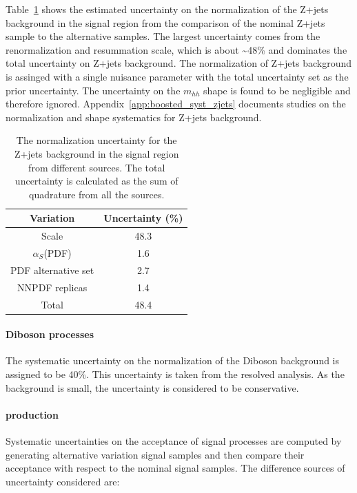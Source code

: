 Table~\ref{tab:boosted_unc_zjets} shows the estimated uncertainty on the normalization of the Z+jets background in the signal region
from the comparison of the nominal Z+jets sample to the alternative samples. The largest uncertainty comes from the renormalization
and resummation scale, which is about \textasciitilde48\% and dominates the total uncertainty on Z+jets background. The normalization of Z+jets
background is assinged with a single nuisance parameter with the total uncertainty set as the prior uncertainty. The uncertainty on the
$m_{hh}$ shape is found to be negligible and therefore ignored. Appendix~\ref{app:boosted_syst_zjets} documents studies on the normalization
and shape systematics for Z+jets background.
 
\begin{table}[htbp!]
\begin{center}
\begin{tabular}{c|c}
Variation  &  Uncertainty (\%) \\
\hline
Scale               &   48.3  \\
$\alpha_{S}$(PDF)   &   1.6   \\
PDF alternative set &   2.7   \\
NNPDF replicas      &   1.4   \\
\hline
Total               &   48.4  \\
\end{tabular}
\end{center}
\caption{The normalization uncertainty for the Z+jets background in the signal region
from different sources. The total uncertainty is calculated as the sum of quadrature from all
the sources.}
\label{tab:boosted_unc_zjets}
\end{table}
 
\FloatBarrier
\paragraph{Diboson processes}
\label{sec:boosted_syst_modeling_diboson}
The systematic uncertainty on the normalization of the Diboson background is assigned to be 40\%. This uncertainty
is taken from the resolved analysis. As the background is small, the uncertainty is considered to be conservative.
 
\paragraph{production}
\label{sec:boosted_syst_modeling_signal}
Systematic uncertainties on the acceptance of signal processes are computed by generating alternative variation signal samples
and then compare their acceptance with respect to the nominal signal samples. The difference sources of uncertainty considered are:
 
